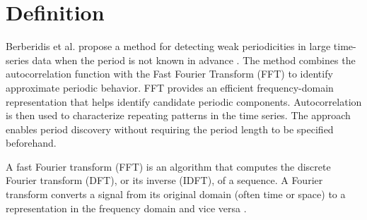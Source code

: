\documentclass[a4paper]{article}
\title{}
\date{}
\author{Mohammad Rahmani}
\begin{document}
   \maketitle
   
   \section{Definition}
   Berberidis et al. propose a method for detecting weak periodicities in large time-series data when the period is not    known in advance \cite{berberidis-2002-on-the-discovery-of-weak-periodicities-in-large-time-series}. The method combines the autocorrelation function with the Fast Fourier Transform (FFT) to identify approximate periodic behavior. FFT provides an efficient frequency-domain representation that helps identify candidate periodic components. Autocorrelation is then used to characterize repeating patterns in the time series. The approach enables period discovery without requiring the period length to be specified beforehand.
   
   A fast Fourier transform (FFT) is an algorithm that computes the discrete Fourier transform (DFT), or its inverse (IDFT), of a sequence. A Fourier transform converts a signal from its original domain (often time or space) to a representation in the frequency domain and vice versa .

   
   
\end{document}
